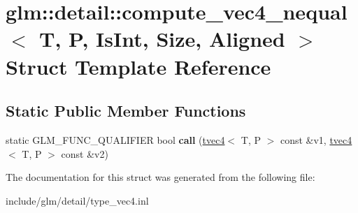 \hypertarget{structglm_1_1detail_1_1compute__vec4__nequal}{}\section{glm\+:\+:detail\+:\+:compute\+\_\+vec4\+\_\+nequal$<$ T, P, Is\+Int, Size, Aligned $>$ Struct Template Reference}
\label{structglm_1_1detail_1_1compute__vec4__nequal}
\subsection*{Static Public Member Functions}
\begin{DoxyCompactItemize}
\item 
\mbox{\label{structglm_1_1detail_1_1compute__vec4__nequal_a0f2c01fc5028a0357e1fb8e3ee4188a8}} 
static G\+L\+M\+\_\+\+F\+U\+N\+C\+\_\+\+Q\+U\+A\+L\+I\+F\+I\+ER bool {\bfseries call} (\hyperlink{structglm_1_1tvec4}{tvec4}$<$ T, P $>$ const \&v1, \hyperlink{structglm_1_1tvec4}{tvec4}$<$ T, P $>$ const \&v2)
\end{DoxyCompactItemize}


The documentation for this struct was generated from the following file\+:\begin{DoxyCompactItemize}
\item 
include/glm/detail/type\+\_\+vec4.\+inl\end{DoxyCompactItemize}
